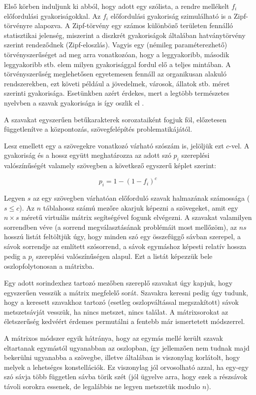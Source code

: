 \documentclass[
    parspace,
    noindent,
    nohyp,
]{elteiktdk}[2023/04/10]
\begin{document}
Első körben induljunk ki abból, hogy adott egy szólista, a rendre mellékelt $f_i$ előfordulási gyakoriságokkal.
Az $f_i$ előfordulási gyakoriság szimulálható is a Zipf-törvényre alapozva.
A Zipf-törvény egy számos különböző területen fennálló statisztikai jelenség,
miszerint a diszkrét gyakoriságok általában hatványtörvény szerint rendeződnek (Zipf-eloszlás).
Vagyis egy (némileg paraméterezhető) törvényszerűséget ad meg arra vonatkozóan,
hogy a leggyakoribb, második leggyakoribb stb. elem
milyen gyakorisággal fordul elő a teljes mintában.
A törvényszerűség meglehetősen egyetemesen fennáll az organikusan alakuló rendszerekben,
ezt követi például a jövedelmek, városok, állatok stb. méret szerinti gyakorisága.
Esetünkben azért érdekes, mert a legtöbb természetes nyelvben a szavak gyakorisága is így oszlik el%
\cite{Zipf1942UnityOfNature}.

A szavakat egyszerűen betűkarakterek sorozataiként fogjuk föl,
előzetesen függetlenítve a központozás, szövegfelépítés problematikájától.

Lesz emellett egy a szövegekre vonatkozó várható szószám is, jelöljük ezt $c$-vel.
A gyakoriság és a hossz együtt meghatározza az adott szó
$p_i$ szereplési valószínűségét valamely szövegben a következő egyszerű képlet szerint:

$$
p_i = 1 - (1 - f_i)^c
$$

Legyen $s$ az egy szövegben várhatóan előforduló szavak halmazának számossága ($s \leq c$).
Az $n$ táblahossz számú mezőre akarjuk képezni a szövegeket,
amit egy $n \times s$ méretű virtuális mátrix segítségével fogunk elvégezni.
A szavakat valamilyen sorrendben véve (a sorrend megválasztásának problémáit most mellőzöm),
az $n s$ hosszú listát feltöltjük úgy, hogy minden szó egy összefüggő sávban szerepel,
a sávok sorrendje az említett szósorrend,
a sávok egymáshoz képesti relatív hossza pedig a $p_i$ szereplési valószínűségen alapul.
Ezt a listát képezzük bele oszlopfolytonosan a mátrixba.

Egy adott sorindexhez tartozó mezőben szereplő szavakat úgy kapjuk,
hogy egyszerűen vesszük a mátrix megfelelő sorát.
Szavakra keresni pedig úgy tudunk, hogy a keresett szavakhoz tartozó
(esetleg oszlopváltással megszakított) sávok metszetsávját vesszük,
ha nincs metszet, nincs találat.
A mátrixsorokat az életszerűség kedvéért érdemes permutálni a fentebb már ismertetett módszerrel.

A mátrixos módszer egyik hátránya,
hogy az egymás mellé került szavak eltartanak egymástól ugyanabban az oszlopban,
így jellemzően nem tudnak majd bekerülni ugyanabba a szövegbe,
illetve általában is viszonylag korlátolt,
hogy melyek a lehetséges konstellációk.
Ez viszonylag jól orvosolható azzal, ha egy-egy szó sávja több független sávba törik szét
(jól ügyelve arra, hogy ezek a részsávok távoli sorokra essenek,
de legalábbis ne legyen metszetük modulo $n$).
\end{document}
